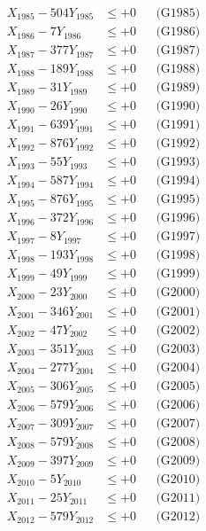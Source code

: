 \documentclass[a4paper,10pt]{article}
\begin{document}
{\begin{align}
X_{1985} - 504Y_{1985} &\leq +0 && \text{(G1985)} \\
X_{1986} - 7Y_{1986} &\leq +0 && \text{(G1986)} \\
X_{1987} - 377Y_{1987} &\leq +0 && \text{(G1987)} \\
X_{1988} - 189Y_{1988} &\leq +0 && \text{(G1988)} \\
X_{1989} - 31Y_{1989} &\leq +0 && \text{(G1989)} \\
X_{1990} - 26Y_{1990} &\leq +0 && \text{(G1990)} \\
\allowbreak
X_{1991} - 639Y_{1991} &\leq +0 && \text{(G1991)} \\
X_{1992} - 876Y_{1992} &\leq +0 && \text{(G1992)} \\
X_{1993} - 55Y_{1993} &\leq +0 && \text{(G1993)} \\
X_{1994} - 587Y_{1994} &\leq +0 && \text{(G1994)} \\
X_{1995} - 876Y_{1995} &\leq +0 && \text{(G1995)} \\
X_{1996} - 372Y_{1996} &\leq +0 && \text{(G1996)} \\
X_{1997} - 8Y_{1997} &\leq +0 && \text{(G1997)} \\
X_{1998} - 193Y_{1998} &\leq +0 && \text{(G1998)} \\
X_{1999} - 49Y_{1999} &\leq +0 && \text{(G1999)} \\
X_{2000} - 23Y_{2000} &\leq +0 && \text{(G2000)} \\
\allowbreak
X_{2001} - 346Y_{2001} &\leq +0 && \text{(G2001)} \\
X_{2002} - 47Y_{2002} &\leq +0 && \text{(G2002)} \\
X_{2003} - 351Y_{2003} &\leq +0 && \text{(G2003)} \\
X_{2004} - 277Y_{2004} &\leq +0 && \text{(G2004)} \\
X_{2005} - 306Y_{2005} &\leq +0 && \text{(G2005)} \\
X_{2006} - 579Y_{2006} &\leq +0 && \text{(G2006)} \\
X_{2007} - 309Y_{2007} &\leq +0 && \text{(G2007)} \\
X_{2008} - 579Y_{2008} &\leq +0 && \text{(G2008)} \\
X_{2009} - 397Y_{2009} &\leq +0 && \text{(G2009)} \\
X_{2010} - 5Y_{2010} &\leq +0 && \text{(G2010)} \\
\allowbreak
X_{2011} - 25Y_{2011} &\leq +0 && \text{(G2011)} \\
X_{2012} - 579Y_{2012} &\leq +0 && \text{(G2012)} \\

\end{align}}
\end{document}
